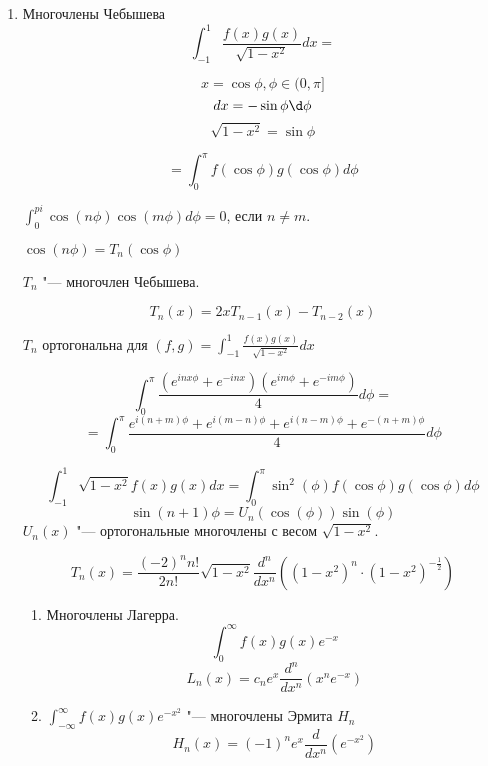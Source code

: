 \begin{enumerate}
\begin{proof}
    $$\frac{d^n}{dx^n}(x^2 - 1)^n|_{x = 1} = \frac{d^n}{dx^n}(x - 1)^n(x + 1)^n|_{x = 1} = \sum_{k = 0}\binom{n}{k}\frac{d^k}{dx^k}(x - 1)^n\frac{d^{n - k}}{dx^{n - k}}(x + 1)^n|_{x = 1} = $$
    $$ \binom{n}{k}(\frac{d^n}{dx^n}(x - 1)^n)(x + 1)^n|_{x = 1} = n!(1 + 1)^n = 2^nn!$$

    $$P_n(1) = \frac{1}{2^nn!}2^nn! = 1$$
    \end{proof}

    \begin{theorem}
    \begin{enumerate}
    \item
    $$\sum_{n = 0}^{\infty}P_n(x)z^n = \frac{1}{\sqrt{1 - 2xz + z^2}}$$
    $x \in [-1,1]$ z в некоторой окрестности 0.
    \item
    $$\sum_{n = 0}^{\infty}P_n(1)z^n = \frac{1}{1 - z} = 1 + z + z^2 + \cdots $$
    $$P_n(1) = 1$$
    \item
    $$\sum_{n = 0}^{\infty}P_n(-1)z^n = \frac{1}{1 + z} = 1 - z + z^2 - \cdots$$

    $$P_n(-1) = (-1)^n $$
    \end{enumerate}
    \end{theorem}
\item Многочлены Чебышева
$$\int_{-1}^{1} \frac{f(x)g(x)}{\sqrt{1 - x^2}}dx=$$

$$x = \cos \phi, \phi \in (0, \pi]$$
$$dx = -\sin \phi \d\phi $$
$$\sqrt{1 - x^2} = \sin \phi$$

$$= \int_{0}^{\pi}f(\cos \phi)g(\cos \phi) d \phi$$

$\int_{0}^{pi}\cos(n\phi)\cos(m\phi) d \phi = 0$, если $n \ne m$.

$\cos(n \phi) = T_n(\cos \phi)$

$T_n$ "--- многочлен Чебышева. 

$$T_n(x) = 2xT_{n - 1}(x) - T_{n - 2}(x)$$

$T_n$ ортогональна для $(f, g) = \int_{-1}^{1}\frac{f(x)g(x)}{\sqrt{1 - x^2}}dx$

$$\int_{0}^{\pi}\frac{(e^{inx\phi} + e^{-inx})(e^{im\phi} + e^{-im\phi})}{4} d\phi =  $$
$$= \int_{0}^{\pi}\frac{e^{i(n + m)\phi} + e^{i(m - n) \phi} + e^{i(n - m) \phi} + e^{-(n + m)\phi}}{4}d\phi $$

$$\int_{-1}^{1}\sqrt{1 - x^2}f(x)g(x)dx = \int_{0}^{\pi}\sin^2(\phi)f(\cos \phi)g(\cos \phi) d \phi$$
$$\sin(n + 1)\phi= U_n(\cos(\phi))\sin(\phi)$$
$U_n(x)$ "--- ортогональные многочлены с весом $\sqrt{1 - x^2}$.

$$T_n(x) = \frac{(-2)^nn!}{2n!}\sqrt{1 - x^2}\frac{d^n}{dx^n}((1 - x^2)^n \cdot (1 - x^2)^{-\frac{1}{2}}) $$
\begin{exmp}
\begin{enumerate}
\item
Многочлены Лагерра. 
$$\int_{0}^{\infty}f(x)g(x)e^{-x}$$
$$L_n(x) = c_ne^x \frac{d^n}{dx^n}(x^ne^{-x}) $$
\item 
$\int_{- \infty}^{\infty}f(x)g(x)e^{-x^2}$  "--- многочлены Эрмита $H_n$
$$H_n(x) = (-1)^ne^x\frac{d}{dx^n}(e^{-x^2})$$
\end{enumerate}
\end{exmp}
\end{enumerate}
